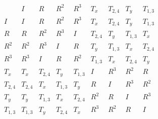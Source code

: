 \[
\begin{array}{l|llllllll}
           & I       & R       & R^2     & R^3     & T_x     & T_{2,4} & T_y     & T_{1,3}\\\hline
   I       & I       & R       & R^2     & R^3     & T_x     & T_{2,4} & T_y     & T_{1,3}\\
   R       & R       & R^2     & R^3     & I       & T_{2,4} & T_y     & T_{1,3} & T_x\\
   R^2     & R^2     & R^3     & I       & R       & T_y     & T_{1,3} & T_x     & T_{2,4}\\
   R^3     & R^3     & I       & R       & R^2     & T_{1,3} & T_x     & T_{2,4} & T_y\\
   T_x     & T_x     & T_{2,4} & T_y     & T_{1,3} & I       & R^3     & R^2     & R\\
   T_{2,4} & T_{2,4} & T_x     & T_{1,3} & T_y     & R       & I       & R^3     & R^2\\
   T_y     & T_y     & T_{1,3} & T_x     & T_{2,4} & R^2     & R       & I       & R^3\\
   T_{1,3} & T_{1,3} & T_y     & T_{2,4} & T_x     & R^3     & R^2     & R       & I\\
\end{array}
\]
